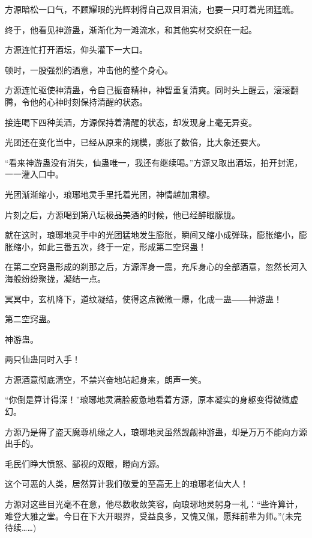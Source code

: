 \begin{this_body}
方源暗松一口气，不顾耀眼的光辉刺得自己双目泪流，也要一只盯着光团猛瞧。

终于，他看见神游蛊，渐渐化为一滩流水，和其他实材交织在一起。

方源连忙打开酒坛，仰头灌下一大口。

顿时，一股强烈的酒意，冲击他的整个身心。

方源连忙驱使神清蛊，令自己振奋精神，神智重复清爽。同时头上醒云，滚滚翻腾，令他的心神时刻保持清醒的状态。

接连喝下四种美酒，方源保持着清醒的状态，却发现身上毫无异变。

光团还在变化当中，已经从原来的规模，膨胀了数倍，比大象还要大。

“看来神游蛊没有消失，仙蛊唯一，我还有继续喝。”方源又取出酒坛，拍开封泥，一一灌入口中。

光团渐渐缩小，琅琊地灵手里托着光团，神情越加肃穆。

片刻之后，方源喝到第八坛极品美酒的时候，他已经醉眼朦胧。

就在这时，琅琊地灵手中的光团猛地发生膨胀，瞬间又缩小成弹珠，膨胀缩小，膨胀缩小，如此三番五次，终于一定，形成第二空窍蛊！

在第二空窍蛊形成的刹那之后，方源浑身一震，充斥身心的全部酒意，忽然长河入海般纷纷聚拢，凝结一点。

冥冥中，玄机降下，道纹凝结，使得这点微微一爆，化成一蛊――神游蛊！

第二空窍蛊。

神游蛊。

两只仙蛊同时入手！

方源酒意彻底清空，不禁兴奋地站起身来，朗声一笑。

“你倒是算计得深！”琅琊地灵满脸疲惫地看着方源，原本凝实的身躯变得微微虚幻。

方源乃是得了盗天魔尊机缘之人，琅琊地灵虽然觊觎神游蛊，却是万万不能向方源出手的。

毛民们睁大愤怒、鄙视的双眼，瞪向方源。

这个可恶的人类，居然算计我们敬爱的至高无上的琅琊老仙大人！

方源对这些目光毫不在意，他尽数收敛笑容，向琅琊地灵躬身一礼：“些许算计，难登大雅之堂。今日在下大开眼界，受益良多，又愧又佩，愿拜前辈为师。”(未完待续……)

\end{this_body}

